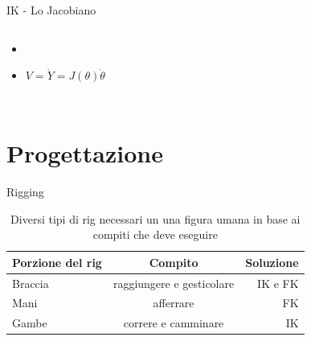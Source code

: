 \documentclass[10pt]{beamer}
\begin{document}
\begin{frame}[fragile]{IK - Lo Jacobiano}
{\begin{columns}[onlytextwidth]
{\begin{itemize}
          \item<3->
          \item<4-5>$V = \dot{Y} = J(\theta)\dot{\theta}$
        \end{itemize}
      }
    \end{columns}
  }
\end{frame}


\section{Progettazione}	%
\begin{frame}{Rigging}	%
  \begin{table}					%
					\caption{Diversi tipi di rig necessari un una figura umana in base ai compiti che deve eseguire}
		\begin{tabular}{lcr}%
			\toprule
			Porzione del rig & Compito & Soluzione\\
			\midrule
			Braccia & raggiungere e gesticolare & IK e FK\\
			Mani & afferrare & FK\\
			Gambe & correre e camminare & IK\\
			\bottomrule
		\end{tabular}
	\end{table}	
\end{frame}
\end{document}
